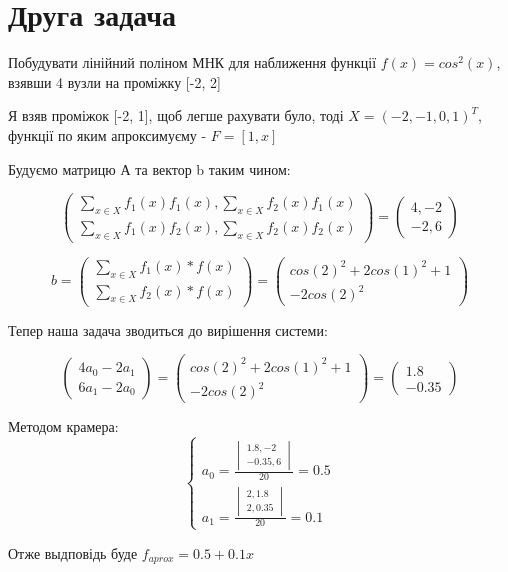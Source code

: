 \section{Друга задача}

\begin{tcolorbox}[title=Задача 2]
    \begin{center}
        Побудувати лінійний поліном МНК для наближення функції 
        $f(x) = cos^2(x)$, взявши 4 вузли на проміжку [-2, 2]
    \end{center}
\end{tcolorbox}

Я взяв проміжок [-2, 1], щоб легше рахувати було, тоді $X = (-2, -1, 0, 1)^T$, 
функції по яким апроксимуєму - $F = [1, x]$


Будуємо матрицю А та вектор b таким чином:

$$\begin{pmatrix}
    \sum\limits_{x \in X} f_1(x)f_1(x), \sum\limits_{x \in X} f_2(x)f_1(x)\\
    \sum\limits_{x \in X} f_1(x)f_2(x), \sum\limits_{x \in X} f_2(x)f_2(x)
\end{pmatrix} = 
\begin{pmatrix}
    4, -2 \\
    -2, 6
\end{pmatrix}$$

$$ b = \begin{pmatrix}
    \sum\limits_{x\in X}f_1(x)*f(x)\\
    \sum\limits_{x\in X}f_2(x)*f(x)
\end{pmatrix} = \begin{pmatrix}
    cos(2)^2 + 2cos(1)^2 + 1 \\ -2cos(2)^2
\end{pmatrix}
$$

Тепер наша задача зводиться до вирішення системи:

$$ \begin{pmatrix} 4a_0 - 2a_1 \\ 6a_1 - 2a_0  \end{pmatrix} =
\begin{pmatrix}cos(2)^2 + 2cos(1)^2 + 1 \\ -2cos(2)^2 \end{pmatrix} = 
\begin{pmatrix}1.8 \\ -0.35\end{pmatrix}
$$

Методом крамера:
$$
\begin{cases}
    a_0 = \frac{\begin{vmatrix}1.8, -2 \\ -0.35, 6 \end{vmatrix} }{20} = 0.5\\
    a_1 = \frac{\begin{vmatrix}2, 1.8 \\ 2, 0.35 \end{vmatrix} }{20} = 0.1
\end{cases}
$$

Отже выдповідь буде $f_{aprox} = 0.5 + 0.1x$